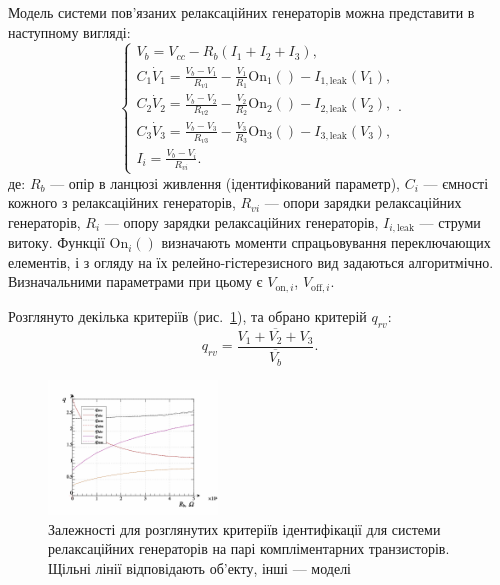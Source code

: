 \documentclass[a4paper,13pt]{atuaref}
\begin{document}
Модель системи пов'язаних релаксаційних генераторів можна представити в наступному вигляді:
%
\begin{equation}
  \begin{cases}
    V_b = V_{cc} - R_b ( I_1 + I_2 + I_3 ), \\
      C_1 \dot{V}_1 = \frac{V_b-V_1}{R_{v1}} - \frac{V_1}{R_1} \mathrm{On}_1() - I_{1,\mathrm{leak}}(V_1), \\
      C_2 \dot{V}_2 = \frac{V_b-V_2}{R_{v2}} - \frac{V_2}{R_2} \mathrm{On}_2() - I_{2,\mathrm{leak}}(V_2), \\
      C_3 \dot{V}_3 = \frac{V_b-V_3}{R_{v3}} - \frac{V_3}{R_3} \mathrm{On}_3() - I_{3,\mathrm{leak}}(V_3), \\
      I_i = \frac{V_b-V_i}{R_{vi}}.
  \end{cases}.
    \label{atu:eq:relax3}
\end{equation}
%
де:
$R_b$ --- опір в ланцюзі живлення (ідентифікований параметр),
$C_i$ --- ємності кожного з релаксаційних генераторів,
$R_{vi}$ --- опори зарядки релаксаційних генераторів,
$R_{i}$ --- опору зарядки релаксаційних генераторів,
$I_{i,\mathrm{leak}}$ --- струми витоку.
Функції $\mathrm{On}_i() $ визначають моменти спрацьовування переключающих
елементів, і з огляду на їх релейно-гістерезисного вид задаються алгоритмічно.
Визначальними параметрами при цьому є
$V_{\mathrm{on},i}$, $V_{\mathrm{off},i}$.


Розглянуто декілька критеріїв (рис.~\ref{atu:f:relax3d_q}), та обрано критерій $q_{rv}$:
%
\begin{equation}
  q_{rv} = \frac{\overline{V_1+V_2+V_3}}{\overline{V_b}}.
  \label{atu:eq:q_rv_relax}
\end{equation}

\begin{figure}[htb!]
  \centerline{\includegraphics[width=0.40\textwidth]{p7/p/relax3d_read_q-p_q1.png} }
  \caption{Залежності для розглянутих критеріїв ідентифікації для системи
  релаксаційних генераторів на парі компліментарних транзисторів.
  Щільні лінії відповідають об'екту, інші --- моделі}
  \label{atu:f:relax3d_q}
\end{figure}
\end{document}
